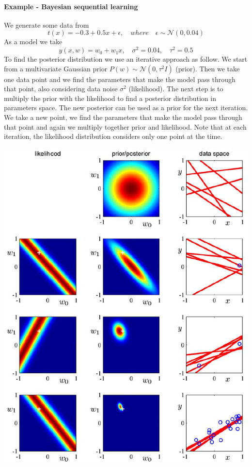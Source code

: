 \documentclass[main.tex]{subfiles}
\begin{document}
\paragraph{Example - Bayesian sequential learning} 
We generate some data from 
\begin{equation*}
    t(x) = -0.3 + 0.5x + \epsilon, \quad where \quad \epsilon \sim \mathcal{N}(0,0.04)
\end{equation*}
As a model we take
\begin{equation*}
    y(x,w) = w_0+w_1x, \quad \sigma^2=0.04, \quad \tau^2=0.5
\end{equation*}
To find the posterior distribution we use an iterative approach as follow.
We start from a multivariate Gaussian prior $P(w) \sim \mathcal{N}(0,\tau^2 I)$ (prior). Then we take one data point and we find the parameters that make the model pass through that point, also considering data noise $\sigma^2$ (likelihood). The next step is to multiply the prior with the likelihood to find a posterior distribution in parameters space. The new posterior can be used as a prior for the next iteration. We take a new point, we find the parameters that make the model pass through that point and again we multiply together prior and likelihood. Note that at each iteration, the likelihood distribution considers only one point at the time.
\begin{center}
    \includegraphics[scale=0.6]{img/Bayes_sequential.PNG}
\end{center}
\end{document}
